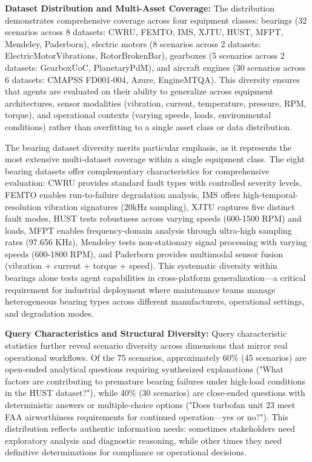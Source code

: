 \documentclass[sigconf, screen, nonacm]{acmart}
\begin{document}
\textbf{Dataset Distribution and Multi-Asset Coverage:} The distribution demonstrates comprehensive coverage across four equipment classes: bearings (32 scenarios across 8 datasets: CWRU, FEMTO, IMS, XJTU, HUST, MFPT, Mendeley, Paderborn), electric motors (8 scenarios across 2 datasets: ElectricMotorVibrations, RotorBrokenBar), gearboxes (5 scenarios across 2 datasets: GearboxUoC, PlanetaryPdM), and aircraft engines (30 scenarios across 6 datasets: CMAPSS FD001-004, Azure, EngineMTQA). This diversity ensures that agents are evaluated on their ability to generalize across equipment architectures, sensor modalities (vibration, current, temperature, pressure, RPM, torque), and operational contexts (varying speeds, loads, environmental conditions) rather than overfitting to a single asset class or data distribution.

The bearing dataset diversity merits particular emphasis, as it represents the most extensive multi-dataset coverage within a single equipment class. The eight bearing datasets offer complementary characteristics for comprehensive evaluation: CWRU provides standard fault types with controlled severity levels, FEMTO enables run-to-failure degradation analysis, IMS offers high-temporal-resolution vibration signatures (20kHz sampling), XJTU captures five distinct fault modes, HUST tests robustness across varying speeds (600-1500 RPM) and loads, MFPT enables frequency-domain analysis through ultra-high sampling rates (97.656 KHz), Mendeley tests non-stationary signal processing with varying speeds (600-1800 RPM), and Paderborn provides multimodal sensor fusion (vibration + current + torque + speed). This systematic diversity within bearings alone tests agent capabilities in cross-platform generalization---a critical requirement for industrial deployment where maintenance teams manage heterogeneous bearing types across different manufacturers, operational settings, and degradation modes.

\textbf{Query Characteristics and Structural Diversity:} Query characteristic statistics further reveal scenario diversity across dimensions that mirror real operational workflows. Of the 75 scenarios, approximately 60\% (45 scenarios) are open-ended analytical questions requiring synthesized explanations ("What factors are contributing to premature bearing failures under high-load conditions in the HUST dataset?"), while 40\% (30 scenarios) are close-ended questions with deterministic answers or multiple-choice options ("Does turbofan unit 23 meet FAA airworthiness requirements for continued operation---yes or no?"). This distribution reflects authentic information needs: sometimes stakeholders need exploratory analysis and diagnostic reasoning, while other times they need definitive determinations for compliance or operational decisions.
\end{document}
